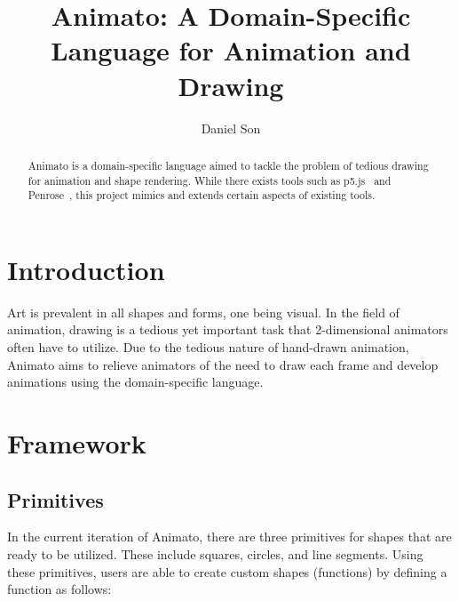 \documentclass[acmsmall,screen]{acmart}
\begin{document}
\title{Animato: A Domain-Specific Language for Animation and Drawing}

\author{Daniel Son}

\renewcommand{\shortauthors}{Daniel Son}

\renewcommand\footnotetextcopyrightpermission[1]{}
\pagestyle{fancy}
\fancyfoot{}
\makeatletter
\let\@authorsaddresses\@empty
\makeatother

\begin{abstract}
    Animato is a domain-specific language aimed to tackle the problem of tedious drawing for animation and shape rendering.
    While there exists tools such as p5.js~\cite{p5js} and Penrose~\cite{penrose}, this project mimics and extends certain aspects of existing tools.

\end{abstract}


\maketitle
\thispagestyle{firstfancy}

\section{Introduction}
Art is prevalent in all shapes and forms, one being visual.
In the field of animation, drawing is a tedious yet important task that 2-dimensional animators often have to utilize.
Due to the tedious nature of hand-drawn animation, Animato aims to relieve animators of the need to draw each frame and develop animations using the domain-specific language.

\section{Framework}
\subsection{Primitives}
In the current iteration of Animato, there are three primitives for shapes that are ready to be utilized.
These include squares, circles, and line segments. Using these primitives, users are able to create custom shapes (functions) by defining a function as follows:
\end{document}
